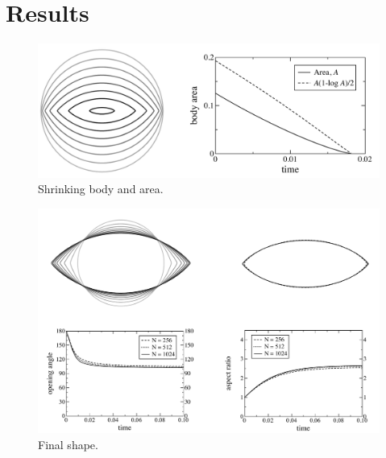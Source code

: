 \documentclass[preprint, 10pt]{elsarticle}
\begin{document}
\section{Results\label{s:results}} 

\begin{figure}%
\begin{center}
\includegraphics[width = 0.9 \textwidth]{./figs/fig3.pdf}
\caption{Shrinking body and area.}
\label{fig1}
\end{center}
\end{figure}

\begin{figure}%
\begin{center}
\includegraphics[width = 0.99 \textwidth]{./figs/fig4.pdf}
\caption{Final shape.}
\label{fig2}
\end{center}
\end{figure}
\end{document}

